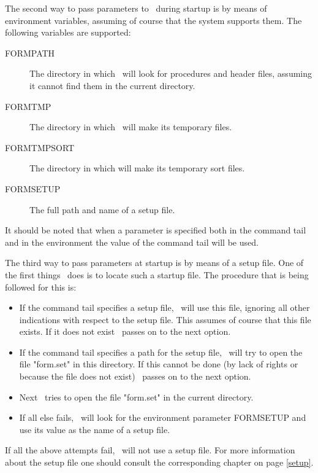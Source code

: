 The second way to pass parameters to \FORM\ during startup is by means of 
environment variables, assuming of course that 
the system supports them. The following variables are supported:
\begin{description}
\item[FORMPATH] The directory in which \FORM\ will look for 
procedures and header files, assuming it cannot find them in the current 
directory.
\item[FORMTMP] The directory in which \FORM\ will make its 
temporary files.
\item[FORMTMPSORT] The directory in which \FORM{} will make 
its temporary sort files.
\item[FORMSETUP] The full path and name of a setup 
file.
\end{description}
It should be noted that when a parameter is specified both in the command 
tail and in the environment the value of the command tail will be used.

The third way to pass parameters at startup is by means of a setup 
file. 
One of the first things \FORM\ does is to locate such a startup file. The 
procedure that is being followed for this is:
\begin{itemize}
\item If the command tail specifies a setup file, \FORM\ will use this file, 
ignoring all other indications with respect to the setup file. This assumes 
of course that this file exists. If it does not exist \FORM\ passes on to the 
next option.
\item If the command tail specifies a path for the setup file, \FORM\ will 
try to open the file "form.set" in this directory. If this cannot be done 
(by lack of rights or because the file does not exist) \FORM\ passes on to 
the next option.
\item Next \FORM\ tries to open the file "form.set" in the 
current directory.\item If all else fails, \FORM\ will look for the 
environment parameter FORMSETUP and use its value as the name of a setup 
file.
\end{itemize}
If all the above attempts fail, \FORM\ will not use a setup file. For more 
information about the setup file one should consult the corresponding 
chapter on page \ref{setup}.
